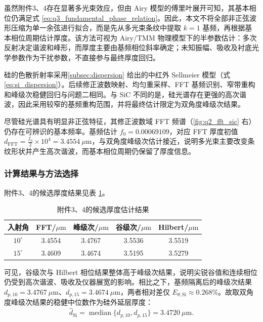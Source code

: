 \documentclass[withoutpreface,bwprint]{cumcmthesis}
\begin{document}
虽然附件3、4存在显著多光束效应，但由 Airy 模型的傅里叶展开可知，其基本相位仍满足式 \eqref{eq:q3_fundamental_phase_relation}。因此，本文不将全部非正弦波形压缩为单一余弦进行拟合，而是先从多光束条纹中提取 $k=1$ 基频，再根据基本相位周期估计厚度。该方法可视为 Airy/TMM 物理模型下的半参数估计：多次反射决定谐波和峰形，而厚度主要由基频相位斜率确定；未知振幅、吸收及衬底光学参数作为干扰参数，不直接参与最终厚度回归。

硅的色散折射率采用\cref{subsec:dispersion} 给出的中红外 Sellmeier 模型（式 \eqref{eq:si_dispersion}）。后续修正波数映射、均匀重采样、FFT 基频识别、窄带重构和峰级次稳健回归与问题二相同。与 SiC 不同的是，硅光谱存在更强的高次谐波，因此采用较窄的基频重构范围，并将最终估计限定为双角度峰级次结果。

尽管硅光谱具有明显非正弦特征，其修正波数域 FFT 频谱（\cref{fig:q2_fft_sic} 右）仍存在可辨识的基本频率。基频估计 $f_0=0.00069109$，对应 FFT 厚度初值 $d_{\mathrm{FFT}}=\tfrac{f_0}{2}\times10^4=3.4554\ \mu\mathrm m$，与双角度峰级次估计接近，说明多光束主要改变条纹形状并产生高次谐波，而基本相位周期仍保留了厚度信息。

\subsubsection{计算结果与方法选择}

附件3、4的候选厚度结果见表 \ref{tab:q3_si_candidate_results}。

\begin{table}[htbp]
	\centering
	\caption{附件3、4的候选厚度估计结果}
	\label{tab:q3_si_candidate_results}
	\begin{tabular}{ccccc}
		\toprule
		入射角 &
		FFT/$\mu\mathrm{m}$ &
		峰级次/$\mu\mathrm{m}$ &
		谷级次/$\mu\mathrm{m}$ &
		Hilbert/$\mu\mathrm{m}$ \\
		\midrule
		$10^\circ$ & 3.4554 & 3.4767 & 3.5536 & 3.5519 \\
		$15^\circ$ & 3.4609 & 3.4674 & 3.5195 & 3.5279 \\
		\bottomrule
	\end{tabular}
\end{table}

可见，谷级次与 Hilbert 相位结果整体高于峰级次结果，说明尖锐谷值和连续相位仍受到高次谐波、吸收及仪器展宽的影响。相比之下，基频隔离后的峰级次结果 $d_{p,10}=3.4767\ \mu\mathrm m$、$d_{p,15}=3.4674\ \mu\mathrm m$，两者相对差仅 $E_{\theta,\mathrm{Si}}\approx0.268\%$。故取双角度峰级次结果的稳健中位数作为硅外延层厚度：
\begin{equation}
	\widehat d_{\mathrm{Si}}
	=
	\operatorname{median}\{d_{p,10},d_{p,15}\}
	=
	3.4720\ \mu\mathrm{m}.
	\label{eq:q3_si_final_thickness}
\end{equation}
\end{document}
